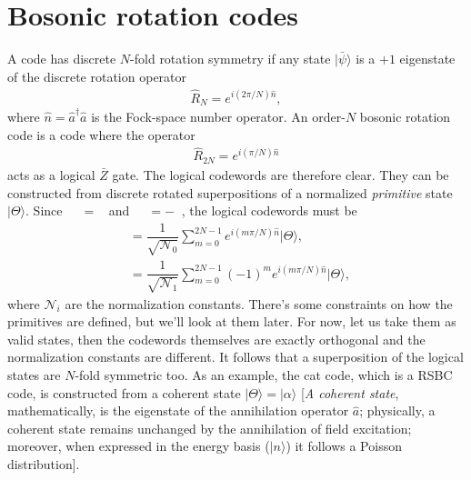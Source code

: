 \documentclass{article}
\DeclareMathOperator{\lgcZ}{\bar{Z}}
\DeclareMathOperator{\lgczero}{|\bar{0}\rangle}
\DeclareMathOperator{\lgcone}{|\bar{1}\rangle}
\begin{document}
\section{Bosonic rotation codes}
A code has discrete $N$-fold rotation symmetry if any state $|\bar{\psi}\rangle$ is a $+1$ eigenstate of the discrete rotation operator 
\begin{align}
    \hat{R}_N = e^{i(2\pi/N)\hat{n}},
\end{align}
where $\hat{n}=\hat{a}^\dagger \hat{a}$ is the Fock-space number operator. An order-$N$ bosonic rotation code is a code where the operator 
\begin{align}
    \hat{R}_{2N} = e^{i(\pi/N)\hat{n}} 
\end{align}
acts as a logical $\bar{Z}$ gate. The logical codewords are therefore clear. They can be constructed from discrete rotated superpositions of a normalized \textit{primitive} state $|\Theta\rangle$. Since $\lgcZ\lgczero=\lgczero$ and $\lgcZ\lgcone=-\lgcone$, the logical codewords must be 
\begin{align}
    \lgczero = \dfrac{1}{\sqrt{\mathcal{N}_0}}\sum_{m=0}^{2N-1}e^{i(m\pi/N)\hat{n}}|\Theta\rangle,\\
    \lgcone = \dfrac{1}{\sqrt{\mathcal{N}_1}}\sum_{m=0}^{2N-1}(-1)^m e^{i(m\pi/N)\hat{n}}|\Theta\rangle,
\end{align}
where $\mathcal{N}_i$ are the normalization constants. There's some constraints on how the primitives are defined, but we'll look at them later. For now, let us take them as valid states, then the codewords themselves are exactly orthogonal and the normalization constants are different. It follows that a superposition of the logical states are $N$-fold symmetric too. 
As an example, the cat code, which is a RSBC code, is constructed from a coherent state $|\Theta\rangle = |\alpha\rangle$ [\textit{A coherent state}, mathematically, is the eigenstate of the annihilation operator $\hat{a}$; physically, a coherent state remains unchanged by the annihilation of field excitation; moreover, when expressed in the energy basis ($|n\rangle$) it follows a Poisson distribution]. 
\end{document}
